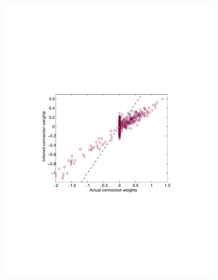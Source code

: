 \begin{figure}
\begin{minipage}[c]{0.45\hsize}
\includegraphics[width=\hsize]{../figs/Figure8b_fluor_weak_glm}
\end{minipage}
\begin{minipage}[c]{0.45\hsize}

\end{minipage}
\end{figure}
